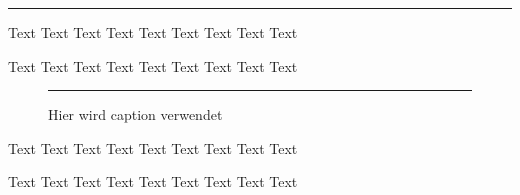 \documentclass[captions=tableheading,parskip=full]{scrartcl}
\begin{document}
\begin{center}

\rule{0.5\textwidth}{3cm}


\end{center}

Text Text Text Text Text Text Text Text Text

Text Text Text Text Text Text Text Text Text

\begin{figure}[!ht]\centering

\rule{0.5\textwidth}{3cm}

\caption{Hier wird caption verwendet}

\end{figure}

Text Text Text Text Text Text Text Text Text

Text Text Text Text Text Text Text Text Text
\end{document}
